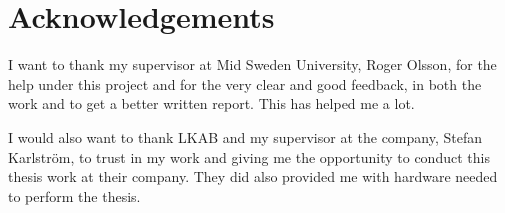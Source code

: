 \chapter*{Acknowledgements}
I want to thank my supervisor at Mid Sweden University, Roger Olsson, for the help under this project and for the very clear and good feedback, in both the work and to get a better written report.
This has helped me a lot.

\bigskip

I would also want to thank LKAB and my supervisor at the company, Stefan Karlström, to trust in my work and giving me the opportunity to conduct this thesis work at their company. 
They did also provided me with hardware needed to perform the thesis.



